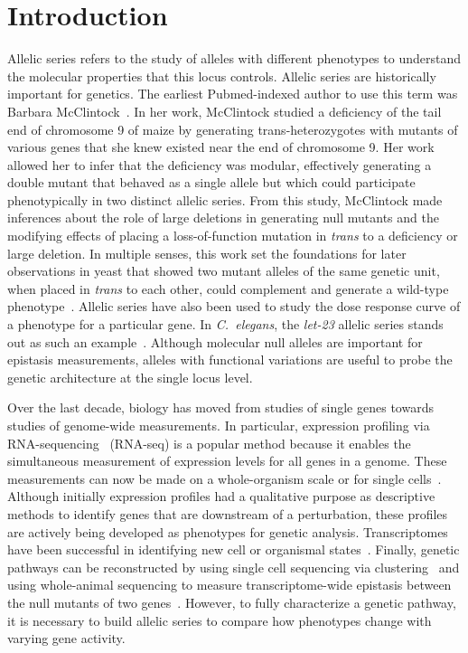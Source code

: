 \documentclass[10pt, onecolumn]{article}
\newcommand{\cel}{\emph{C.~elegans}}
\newcommand{\gene}[1]{\mbox{\emph{#1}}}
\begin{document}
\linenumbers{}

\section*{Introduction}
Allelic series refers to the study of alleles with different phenotypes
to understand the molecular properties that this locus controls. Allelic series
are historically important for genetics. The earliest Pubmed-indexed author to
use this term was Barbara McClintock~\cite{McClintock1944}. In her work,
McClintock studied a deficiency of the tail end of chromosome 9 of maize by
generating trans-heterozygotes with mutants of various genes that she knew
existed near the end of chromosome 9. Her work allowed her to infer that the
deficiency was modular, effectively generating a double mutant that behaved as a
single allele but which could participate phenotypically in two distinct allelic
series. From this study, McClintock made inferences about the role of large
deletions in generating null mutants and the modifying effects of placing a
loss-of-function mutation in \emph{trans} to a deficiency or large deletion. In
multiple senses, this work set the foundations for later observations in yeast
that showed two mutant alleles of the same genetic unit, when placed in
\emph{trans} to each other, could complement and generate a wild-type
phenotype~\cite{FINCHAM1957}. Allelic series have also been used to study the
dose response curve of a phenotype for a particular gene. In \cel{}, the
\gene{let-23} allelic series stands out as such an example~\cite{}. Although
molecular null alleles are important for epistasis measurements, alleles with
functional variations are useful to probe the genetic architecture at the single
locus level.

Over the last decade, biology has moved from studies of single genes towards
studies of genome-wide measurements. In particular, expression profiling via
RNA-sequencing~\cite{Mortazavi2008} (RNA-seq) is a popular method because it
enables the simultaneous measurement of expression levels for all genes in a
genome. These measurements can now be made on a whole-organism scale or for
single cells~\cite{}. Although initially expression profiles had a qualitative
purpose as descriptive methods to identify genes that are downstream of a
perturbation, these profiles are actively being developed as phenotypes for
genetic analysis. Transcriptomes have been successful in identifying new cell or
organismal states~\cite{Angeles-Albores2017,Villani2017}. Finally, genetic
pathways can be reconstructed by using single cell sequencing via
clustering~\cite{Dixit2016} and using whole-animal sequencing to measure
transcriptome-wide epistasis between the null mutants of two genes~\cite{}.
However, to fully characterize a genetic pathway, it is necessary to
build allelic series to compare how phenotypes change with varying
gene activity.
\end{document}
